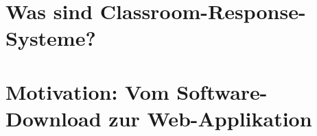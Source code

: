 %
\section{Was sind Classroom-Response-Systeme?}
\label{chap:wassindcrs}


\newpage
\section{Motivation: Vom Software-Download zur Web-Applikation}
\label{chap:webapp}

%